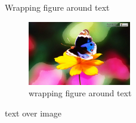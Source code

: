 \documentclass[8pt,aspectratio=169]{beamer}
\begin{document}
\begin{frame}{Wrapping figure around text}
\begin{figure}
	\centering
	\includegraphics[width=0.4\textwidth]{butterfly2.jpg}
	\caption{wrapping figure around text}
\end{figure}
\small\blindtext	
\end{frame}
\begin{frame}{text over image}
\end{frame}
\end{document}
